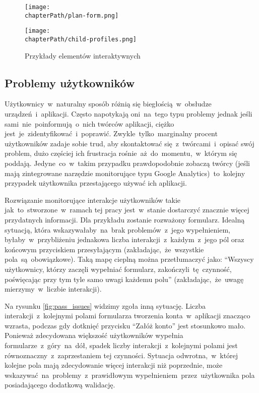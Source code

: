 \bigskip
\begin{figure}[H]
\centering
\begin{minipage}{.3\textwidth}
	\centering
	\texttt{[image: \\chapterPath/plan-form.png]}
\end{minipage}
\begin{minipage}{.4\textwidth}
	\centering
	\texttt{[image: \\chapterPath/child-profiles.png]}
\end{minipage}
\bigskip
\caption{Przykłady elementów interaktywnych}
\label{fig:interactive_areas}
\end{figure}

\subsection{Problemy użytkowników}
Użytkownicy~w~naturalny sposób różnią się biegłością~w~obsłudze urządzeń~i~aplikacji. Często napotykają oni~na~tego typu problemy jednak jeśli sami~nie~poinformują~o~nich twórców aplikacji, ciężko jest~je~zidentyfikować~i~poprawić. Zwykle~tylko~marginalny procent użytkowników zadaje sobie trud, aby skontaktować się~z~twórcami~i~opisać swój problem, dużo częściej ich frustracja rośnie~aż~do~momentu,~w~którym się poddają. Jedyne~co~w~takim przypadku prawdopodobnie zobaczą twórcy (jeśli mają zintegrowane narzędzie monitorujące typu Google Analytics)~to~kolejny przypadek użytkownika przestającego używać ich aplikacji. 

Rozwiązanie monitorujące interakcje użytkowników takie jak~to~stworzone~w~ramach tej pracy jest~w~stanie dostarczyć znacznie więcej przydatnych informacji. Dla przykładu zostanie rozważony formularz. Idealną sytuacją, która wskazywałaby~na~brak problemów~z~jego wypełnieniem, byłaby~w~przybliżeniu jednakowa liczba interakcji~z~każdym~z~jego pól oraz końcowym przyciskiem przesyłającym (zakładając,~że~wszystkie pola~są~obowiązkowe). Taką mapę cieplną można przetłumaczyć jako: ``Wszyscy użytkownicy, którzy zaczęli wypełniać formularz, zakończyli~tę~czynność, poświęcając przy tym tyle samo uwagi każdemu polu'' (zakładając,~że~uwagę mierzymy~w~liczbie interakcji). 

Na rysunku \ref{fig:pass_issues} widzimy zgoła inną sytuację. Liczba interakcji~z~kolejnymi polami formularza tworzenia konta~w~aplikacji znacząco wzrasta, podczas gdy dotknięć przycisku ``Załóż konto'' jest stosunkowo mało. Ponieważ zdecydowana większość użytkowników wypełnia formularze~z~góry~na~dół, spadek liczby interakcji~z~kolejnymi polami jest równoznaczny~z~zaprzestaniem tej czynności. Sytuacja odwrotna,~w~której kolejne pola mają zdecydowanie więcej interakcji niż poprzednie, może wskazywać~na~problemy~z~prawidłowym wypełnieniem~przez~użytkownika pola posiadającego dodatkową walidację. 

